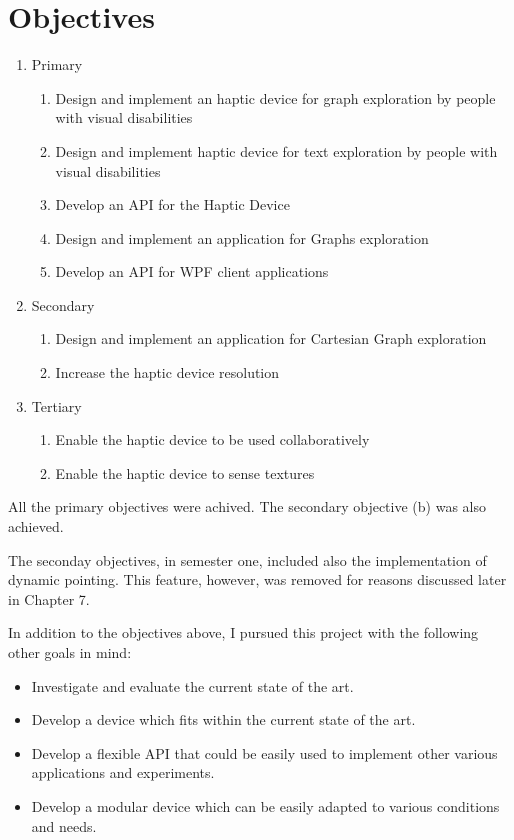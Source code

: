 \chapter{Objectives}


\begin{enumerate}
	\item Primary
    \begin{enumerate}
    	\item Design and implement an haptic device for graph exploration by people with visual disabilities
        \item Design and implement haptic device for text exploration by people with visual disabilities
        \item Develop an API for the Haptic Device
        \item Design and implement an application for Graphs exploration
        \item Develop an API for WPF client applications
    \end{enumerate}
    \item Secondary
    \begin{enumerate}
    	\item Design and implement an application for Cartesian Graph exploration
        \item Increase the haptic device resolution
    \end{enumerate}
    \item Tertiary
    \begin{enumerate}
    	\item Enable the haptic device to be used collaboratively
        \item Enable the haptic device to sense textures
    \end{enumerate}
\end{enumerate}

All the primary objectives were achived. The secondary objective (b) was also achieved. 

The seconday objectives, in semester one, included also the implementation of dynamic pointing. This feature, however, was removed for reasons discussed later in Chapter 7.

In addition to the objectives above, I pursued this project with the following other goals in mind:
\begin{itemize}
	\item Investigate and evaluate the current state of the art.
    \item Develop a device which fits within the current state of the art.
    \item Develop a flexible API that could be easily used to implement other various applications and experiments.
    \item Develop a modular device which can be easily adapted to various conditions and needs.
\end{itemize}